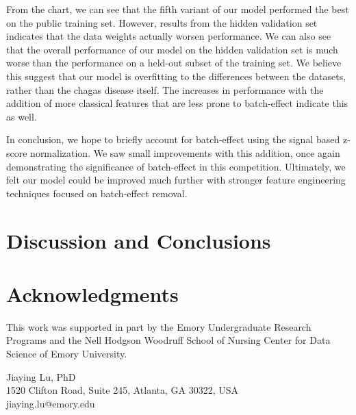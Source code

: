 \documentclass[twocolumn]{cinc}
\begin{document}
From the chart, we can see that the fifth variant of our model performed the best on the public training set. However, results from the hidden validation set indicates that the data weights actually worsen performance. We can also see that the overall performance of our model on the hidden validation set is much worse than the performance on a held-out subset of the training set. We believe this suggest that our model is overfitting to the differences between the datasets, rather than the chagas disease itself. The increases in performance with the addition of more classical features that are less prone to batch-effect indicate this as well.

In conclusion, we hope to briefly account for batch-effect using the signal based z-score normalization. We saw small improvements with this addition, once again demonstrating the significance of batch-effect in this competition. Ultimately, we felt our model could be improved much further with stronger feature engineering techniques focused on batch-effect removal.

\section{Discussion and Conclusions}


\section*{Acknowledgments}  
This work was supported in part by the Emory Undergraduate Research Programs and the Nell Hodgson Woodruff School of Nursing Center for Data Science of Emory University.




\begin{correspondence}
Jiaying Lu, PhD\\
1520 Clifton Road, Suite 245, Atlanta, GA 30322, USA\\
jiaying.lu@emory.edu
\end{correspondence}

\balance
\end{document}
